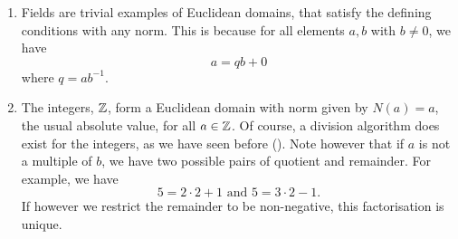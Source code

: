 \begin{ex}
    \phantom{hi}
    \begin{enumerate}
        \item Fields are trivial examples of Euclidean domains, that satisfy the defining conditions with any norm. This is because for all elements $a,b$ with $b \neq 0$, we have
        \[
            a = qb + 0
        \]
        where $q = ab^{-1}$.
        \item The integers, $\mathbb{Z}$, form a Euclidean domain with norm given by $N(a) = a$, the usual absolute value, for all $a \in \mathbb{Z}$. Of course, a division algorithm does exist for the integers, as we have seen before (). Note however that if $a$ is not a multiple of $b$, we have two possible pairs of quotient and remainder. For example, we have
        \[
            5 = 2 \cdot 2 + 1 \text{ and } 5 = 3 \cdot 2 - 1.
        \]
        If however we restrict the remainder to be non-negative, this factorisation is unique.
    \end{enumerate}
\end{ex}


